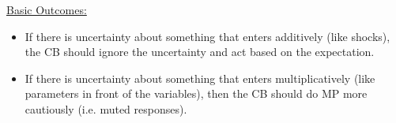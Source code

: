 \underline{Basic Outcomes:}

\begin{itemize}
    \item If there is uncertainty about something that enters additively
    (like shocks), the CB should ignore the uncertainty and act
    based on the expectation.
    \item If there is uncertainty about something that enters
    multiplicatively (like parameters in front of the variables), then
    the CB should do MP more cautiously (i.e. muted responses).
\end{itemize}